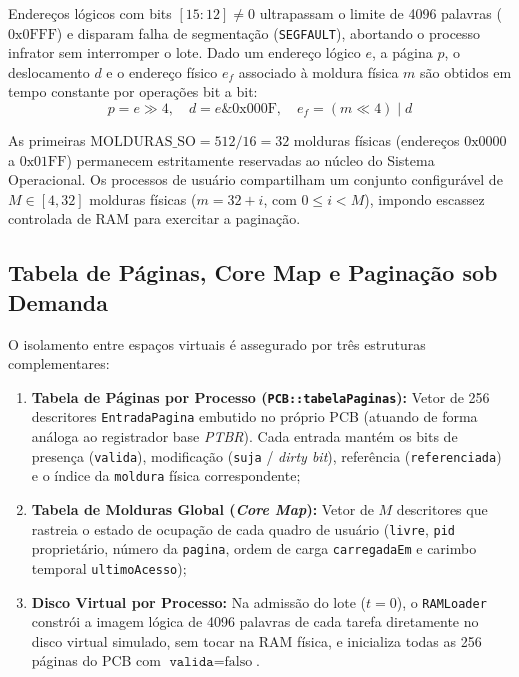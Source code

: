 \documentclass[conference]{IEEEtran}
\begin{document}
Endereços lógicos com bits $[15:12] \neq 0$ ultrapassam o limite de 4096 palavras ($0\text{x}0\text{FFF}$) e disparam falha de segmentação (\texttt{SEGFAULT}), abortando o processo infrator sem interromper o lote. Dado um endereço lógico $e$, a página $p$, o deslocamento $d$ e o endereço físico $e_f$ associado à moldura física $m$ são obtidos em tempo constante por operações bit a bit:
\begin{equation}
p = e \gg 4, \quad d = e \mathbin{\&} \text{0x000F}, \quad e_f = (m \ll 4) \mathbin{|} d
\end{equation}

As primeiras $\text{MOLDURAS\_SO} = 512 / 16 = 32$ molduras físicas (endereços $0\text{x}0000$ a $0\text{x}01\text{FF}$) permanecem estritamente reservadas ao núcleo do Sistema Operacional. Os processos de usuário compartilham um conjunto configurável de $M \in [4, 32]$ molduras físicas ($m = 32 + i$, com $0 \le i < M$), impondo escassez controlada de RAM para exercitar a paginação.

\subsection{Tabela de Páginas, Core Map e Paginação sob Demanda}
O isolamento entre espaços virtuais é assegurado por três estruturas complementares:
\begin{enumerate}
    \item \textbf{Tabela de Páginas por Processo (\texttt{PCB::tabelaPaginas}):} Vetor de 256 descritores \texttt{EntradaPagina} embutido no próprio PCB (atuando de forma análoga ao registrador base \textit{PTBR}). Cada entrada mantém os bits de presença (\texttt{valida}), modificação (\texttt{suja} / \textit{dirty bit}), referência (\texttt{referenciada}) e o índice da \texttt{moldura} física correspondente;
    \item \textbf{Tabela de Molduras Global (\textit{Core Map}):} Vetor de $M$ descritores que rastreia o estado de ocupação de cada quadro de usuário (\texttt{livre}, \texttt{pid} proprietário, número da \texttt{pagina}, ordem de carga \texttt{carregadaEm} e carimbo temporal \texttt{ultimoAcesso});
    \item \textbf{Disco Virtual por Processo:} Na admissão do lote ($t = 0$), o \texttt{RAMLoader} constrói a imagem lógica de 4096 palavras de cada tarefa diretamente no disco virtual simulado, sem tocar na RAM física, e inicializa todas as 256 páginas do PCB com $\texttt{valida} = \text{falso}$.
\end{enumerate}
\end{document}

